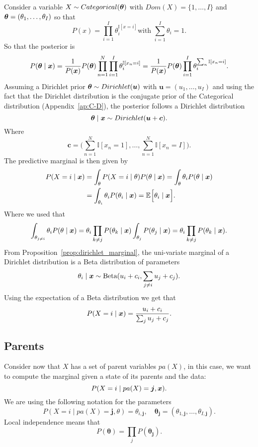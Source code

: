  Consider a variable \(X \sim Categorical(\bm{\theta})\) with
 \(Dom(X) = \{1, \dots, I\} \) and \(\bm{\theta} = (\theta_{1},\dots, \theta_{I})\) so that
 \[
   P(x) = \prod_{i = 1}^{I}\theta_{i}^{\mathbb{I}[x = i]} \text{
     with  } \sum_{i=1}^{I}\theta_{i} = 1.
 \]
 So that the posterior is
 \[
   P(\bm{\theta} \mid \bm{x}) = \frac{1}{P(\bm{x})} P(\bm{\theta}) \prod_{n = 1}^{N}\prod_{i =1 }^{I}\theta_{i}^{\mathbb{I}[x_{n} = i]} =  \frac{1}{P(\bm{x})} P(\bm{\theta}) \prod_{i = 1}^{I} \theta_{i}^{\sum_{n} \mathbb{I}[x_{n}=i]}.
 \]
 Assuming a Dirichlet prior \(\bm{\theta} \sim Dirichlet(\bm{u})\) with \( \bm{u} = (u_{1}, \dots, u_{I})\) and using the fact that the Dirichlet distribution is the conjugate prior of the Categorical distribution (Appendix~\ref{ap:C-D}), the posterior follows a Dirichlet distribution
 \[
   \bm{\theta} \mid \bm{x} \sim Dirichlet(\bm{u} + \bm{c}).
 \]
 Where
 \[
   \bm{c} = \Big( \sum_{n=1}^{N}\mathbb{I}[x_{n} = 1],\dots,  \sum_{n=1}^{N}\mathbb{I}[x_{n} = I]\Big).
 \]
 The predictive marginal is then given by
 \[
   \begin{aligned}
     P(X=i \mid \bm{x}) &= \int_{\theta}P(X=i \mid \theta)P(\theta \mid \bm{x}) =  \int_{\theta}\theta_{i}P(\theta \mid \bm{x})\\
     &=  \int_{\theta_{i}}\theta_{i}P(\theta_{i} \mid \bm{x}) = \mathbb{E}_{}\Big[\theta_{i} \mid \bm{x}\Big].
   \end{aligned}
 \]
 Where we used that
 \[
   \int_{\theta_{j \neq i}}\theta_{i} P(\theta \mid \bm{x}) = \theta_{i}\prod_{k\neq j}P(\theta_{k} \mid \bm{x}) \int_{\theta_{j}}P(\theta_{j}\mid \bm{x}) = \theta_{i} \prod_{k \neq j}P(\theta_{k} \mid \bm{x}).
 \]
From Proposition~\ref{prop:dirichlet_marginal}, the uni-variate marginal of a Dirichlet distribution is a Beta distribution of parameters
\[
  \theta_{i} \mid \bm{x} \sim \text{Beta}(u_{i} + c_{i}, \sum_{j\neq i} u_{j} + c_{j}).
\]
Using the expectation of a Beta distribution we get that
\[
  P(X = i \mid \bm{x}) = \frac{u_{i} + c_{i}}{\sum_{j}u_{j} + c_{j}}.
\]

\subsection{Parents}
Consider now that \(X\) has a set of parent variables \(pa(X)\), in this case,
we want to compute the marginal given a state of its parents and the data:
\[
  P(X = i \mid pa(X) = \bm{j}, \bm{x}).
\]
We are using the following notation for the parameters
\[
  P(X = i \mid pa(X) = \bm{j}, \theta) = \theta_{i,\bm{j}}, \quad \bm{\theta_{j}} = (\theta_{1,\bm{j}},\dots, \theta_{I,\bm{j}}).
\]
Local independence means that
\[
  P(\bm{\theta}) = \prod_{j}P(\bm{\theta_{j}}).
\]

